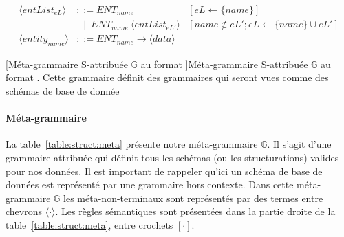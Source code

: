 \begin{landscape}
\begin{adjustbox}{max width=\linewidth,max height=.95\textheight,valign=c}
{\begin{align}
                \langle entList_{eL} \rangle                & ::= ENT_{name}                                                                                                                                                                                                                                                                                                                                                                               & [eL \gets \{name\}]                                                                                               \label{meta:entList:1}  \\
                                                            & ~~ \mid ~ ENT_{name} ~ \langle entList_{eL'} \rangle                                                                                                                                                                                                                                                                                                                                         & [name \notin eL'; eL \gets \{name\} \cup eL']                                                                     \label{meta:entList:2}  \\
                \langle entity_{name} \rangle               & ::= ENT_{name} \to \langle data \rangle \label{meta:entity}
            \end{align}}
    \end{adjustbox}
    [Méta-grammaire S-attribuée $\mathbb{G}$ au format ]{Méta-grammaire S-attribuée $\mathbb{G}$ au format . Cette grammaire définit des grammaires qui seront vues comme des schémas de base de donnée \label{table:struct:meta}}
\end{landscape}

\paragraph{Méta-grammaire}
La table~\ref{table:struct:meta} présente notre méta-grammaire $\mathbb{G}$.
Il s'agit d'une grammaire attribuée qui définit tous les schémas (ou les structurations) valides pour nos données.
Il est important de rappeler qu'ici un schéma de base de données est représenté par une grammaire hors contexte.
Dans cette méta-grammaire $\mathbb{G}$ les méta-non-terminaux sont représentés par des termes entre chevrons $\langle \cdot \rangle$.
Les règles sémantiques sont présentées dans la partie droite de la table~\ref{table:struct:meta}, entre crochets $[ \cdot ]$.

